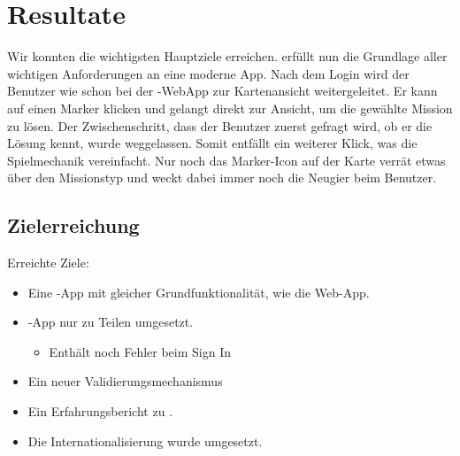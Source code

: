 \chapter{Resultate}
\label{tb-resultate}

Wir konnten die wichtigsten Hauptziele erreichen.
\kort{} erfüllt nun die Grundlage aller wichtigen Anforderungen an eine moderne App.
Nach dem Login wird der Benutzer wie schon bei der \kort{}-\gls{WebApp} zur Kartenansicht weitergeleitet.
Er kann auf einen Marker klicken und gelangt direkt zur Ansicht, um die gewählte Mission zu lösen.
Der Zwischenschritt, dass der Benutzer zuerst gefragt wird, ob er die Lösung kennt, wurde weggelassen.
Somit entfällt ein weiterer Klick, was die Spielmechanik vereinfacht.
Nur noch das Marker-Icon auf der Karte verrät etwas über den Missionstyp und weckt dabei immer noch die Neugier beim Benutzer.


\section{Zielerreichung}

Erreichte Ziele:
\begin{itemize}
	\item Eine -App mit gleicher Grundfunktionalität, wie die Web-App.
	\item {}-App nur zu Teilen umgesetzt.
	\begin{itemize}
		\item Enthält noch Fehler beim  Sign In
	\end{itemize}
	\item Ein neuer Validierungsmechanismus
	\item Ein Erfahrungsbericht zu .
	\item Die Internationalisierung wurde umgesetzt.
\end{itemize}

